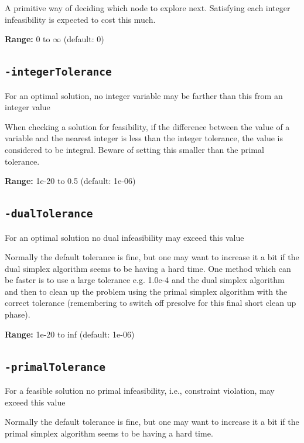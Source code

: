 \documentclass[11pt,a4paper]{article}
\begin{document}
A primitive way of deciding which node to explore next.  Satisfying each integer infeasibility is expected to cost this much.

\textbf{Range:} 0 to $\infty$ (default: 0)

\subsection*{\texttt{-integerTolerance}}

For an optimal solution, no integer variable may be farther than this from an integer value

When checking a solution for feasibility, if the difference between the value of a variable and the nearest integer is less than the integer tolerance, the value is considered to be integral. Beware of setting this smaller than the primal tolerance.

\textbf{Range:} 1e-20 to 0.5 (default: 1e-06)

\subsection*{\texttt{-dualTolerance}}

For an optimal solution no dual infeasibility may exceed this value

Normally the default tolerance is fine, but one may want to increase it a bit if the dual simplex algorithm seems to be having a hard time. One method which can be faster is to use a large tolerance e.g. 1.0e-4 and the dual simplex algorithm and then to clean up the problem using the primal simplex algorithm with the correct tolerance (remembering to switch off presolve for this final short clean up phase).

\textbf{Range:} 1e-20 to inf (default: 1e-06)

\subsection*{\texttt{-primalTolerance}}

For a feasible solution no primal infeasibility, i.e., constraint violation, may exceed this value

Normally the default tolerance is fine, but one may want to increase it a bit if the primal simplex algorithm seems to be having a hard time.
\end{document}
